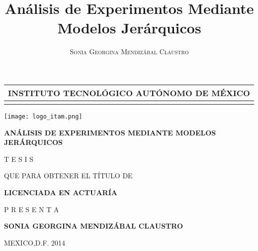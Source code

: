 \documentclass[14pt]{book}
\title{Análisis de Experimentos Mediante Modelos Jerárquicos}
\author{\textsc{Sonia Georgina Mendizábal Claustro}}
\begin{document}
\begin{titlepage}
\begin{center}

\vspace*{\baselineskip} %


\begin{tabular}{c}
\hline 
{\Large{\textbf{INSTITUTO TECNOLÓGICO AUTÓNOMO DE MÉXICO}}}\\
\hline \\
\end{tabular}

\vspace{1cm}
\texttt{[image: logo\_itam.png]}
\vspace{1cm}


{\LARGE{\textbf{ANÁLISIS DE EXPERIMENTOS MEDIANTE MODELOS JERÁRQUICOS}}}




\vspace{.6cm}

\normalsize{T  E  S  I  S

QUE PARA OBTENER EL TÍTULO DE

\textbf{LICENCIADA EN ACTUARÍA}

P R E S E N T A}

\vspace{1cm}
\textsc{\textbf{SONIA GEORGINA MENDIZÁBAL CLAUSTRO }}
\vspace{2cm}


MEXICO,D.F. \hspace{9cm} 2014



\end{center}
\end{titlepage}
\end{document}
